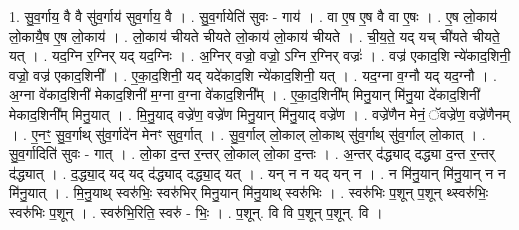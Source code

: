 \documentclass[17pt]{extarticle}
\begin{document}
1. सु॒व॒र्गाय॒ वै वै सु॑व॒र्गाय॑ सुव॒र्गाय॒ वै । . सु॒व॒र्गायेति॑ सुवः - गाय॑ । . वा ए॒ष ए॒ष वै वा ए॒षः । . ए॒ष लो॒काय॑ लो॒कायै॒ष ए॒ष लो॒काय॑ । . लो॒काय॑ चीयते चीयते लो॒काय॑ लो॒काय॑ चीयते । . ची॒य॒ते॒ यद् यच् ची॑यते चीयते॒ यत् । . यद॒ग्नि र॒ग्निर् यद् यद॒ग्निः । . अ॒ग्निर् वज्रो॒ वज्रो॒ ऽग्नि र॒ग्निर् वज्रः॑ । . वज्र॑ एकाद॒शि न्ये॑काद॒शिनी॒ वज्रो॒ वज्र॑ एकाद॒शिनी᳚ । . ए॒का॒द॒शिनी॒ यद् यदे॑काद॒शि न्ये॑काद॒शिनी॒ यत् । . यद॒ग्ना व॒ग्नौ यद् यद॒ग्नौ । . अ॒ग्ना वे॑काद॒शिनी॑ मेकाद॒शिनी॑ म॒ग्ना व॒ग्ना वे॑काद॒शिनी᳚म् । . ए॒का॒द॒शिनी᳚म् मिनु॒यान् मि॑नु॒या दे॑काद॒शिनी॑ मेकाद॒शिनी᳚म् मिनु॒यात् । . मि॒नु॒याद् वज्रे॑ण॒ वज्रे॑ण मिनु॒यान् मि॑नु॒याद् वज्रे॑ण । . वज्रे॑णैन मेनं॒ ॅवज्रे॑ण॒ वज्रे॑णैनम् । . ए॒नꣳ॒॒ सु॒व॒र्गाथ् सु॑व॒र्गादे॑न मेनꣳ सुव॒र्गात् । . सु॒व॒र्गाल् लो॒काल् लो॒काथ् सु॑व॒र्गाथ् सु॑व॒र्गाल् लो॒कात् । . सु॒व॒र्गादिति॑ सुवः - गात् । . लो॒का द॒न्त र॒न्तर् लो॒काल् लो॒का द॒न्तः । . अ॒न्तर् द॑द्ध्याद् दद्ध्या द॒न्त र॒न्तर् द॑द्ध्यात् । . द॒द्ध्या॒द् यद् यद् द॑द्ध्याद् दद्ध्या॒द् यत् । . यन् न न यद् यन् न । . न मि॑नु॒यान् मि॑नु॒यान् न न मि॑नु॒यात् । . मि॒नु॒याथ् स्वरु॑भिः॒ स्वरु॑भिर् मिनु॒यान् मि॑नु॒याथ् स्वरु॑भिः । . स्वरु॑भिः प॒शून् प॒शून् थ्स्वरु॑भिः॒ स्वरु॑भिः प॒शून् । . स्वरु॑भि॒रिति॒ स्वरु॑ - भिः॒ । . प॒शून्. वि वि प॒शून् प॒शून्. वि । \newline
\end{document}
